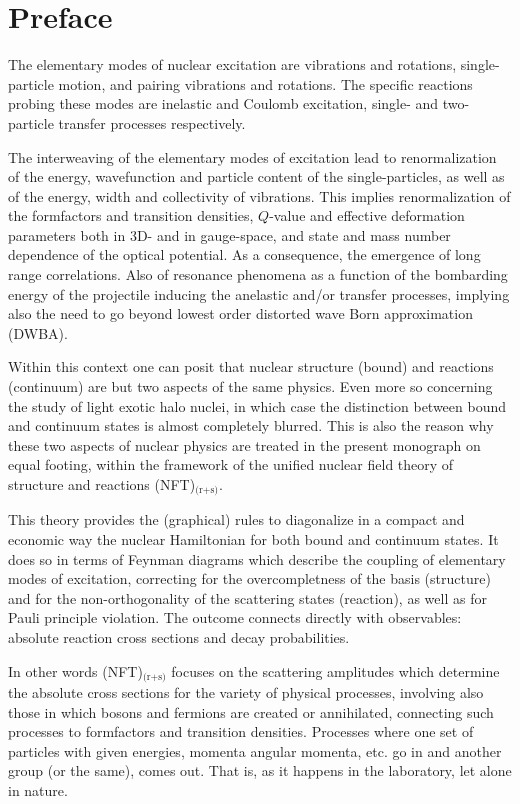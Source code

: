  \chapter*{Preface}
The elementary modes of nuclear excitation are vibrations and rotations, single-particle  motion, and pairing vibrations and rotations. The specific reactions probing these modes are inelastic and Coulomb excitation,  single- and two- particle transfer processes respectively. 

The interweaving of the elementary modes of excitation lead to renormalization of the energy, wavefunction and particle content of the single-particles, as well as of the energy, width and collectivity of vibrations. This implies renormalization of the formfactors and transition densities, $Q$-value and effective deformation parameters both in 3D- and in gauge-space, and state and mass number dependence of the optical potential. As a consequence, the emergence of long range correlations. Also of resonance phenomena as a function of the bombarding energy of the projectile inducing the anelastic and/or transfer processes, implying also the need to go beyond lowest order distorted wave Born approximation (DWBA).

Within this context one can posit that nuclear structure (bound) and reactions (continuum) are but two aspects of the same physics.  Even more so concerning the study of light exotic halo nuclei, in which case the distinction between bound and continuum states is almost completely blurred. This is also the reason why these two aspects of nuclear physics are treated in the present monograph on equal footing,  within the framework of the unified nuclear field theory of structure and reactions (NFT)$_\text{(r+s)}$. 


This theory provides the (graphical) rules to diagonalize in a compact and economic way the nuclear Hamiltonian for both bound and continuum states. It does so in terms of Feynman diagrams which describe the coupling of elementary modes of excitation, correcting for the overcompletness of the basis  (structure) and for the  non-orthogonality of the scattering states (reaction), as well as for Pauli principle violation. The outcome connects directly with observables: absolute reaction cross sections and decay probabilities. 


In other words (NFT)$_\text{(r+s)}$ focuses on the scattering amplitudes which determine the absolute cross sections for the variety of physical processes, involving also those in which bosons and fermions are created or annihilated, connecting such processes to formfactors and transition densities. Processes where one set of particles with given energies, momenta angular momenta, etc. go in and another group (or the same), comes out. That is, as it happens in the laboratory, let alone in nature.

